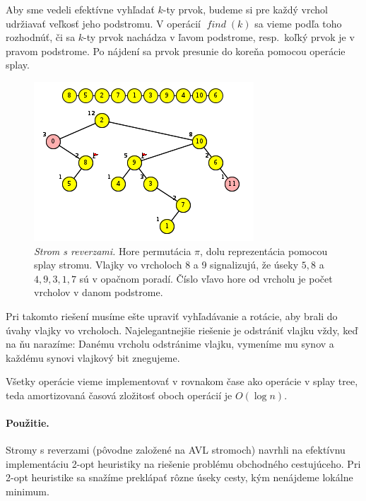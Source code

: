 Aby sme vedeli efektívne vyhľadať $k$-ty prvok, budeme si pre každý vrchol udržiavať veľkosť jeho
podstromu. V operácií $\mathop{\mathit{find}}(k)$ sa vieme podľa toho rozhodnúť, či sa $k$-ty prvok nachádza v ľavom podstrome,
resp.~koľký prvok je v pravom podstrome. Po nájdení sa prvok presunie do koreňa pomocou operácie splay.

\begin{figure}
\includegraphics[width=\columnwidth]{obrazky/reversal.png}
\caption{\emph{Strom s reverzami.} Hore permutácia $\pi$, dolu reprezentácia pomocou splay stromu.
Vlajky vo vrcholoch 8 a 9 signalizujú, že úseky $5,8$ a $4,9,3,1,7$ sú v opačnom poradí. Číslo vľavo
hore od vrcholu je počet vrcholov v danom podstrome.}
\label{img:rev1}
\end{figure}

Pri takomto riešení musíme ešte upraviť vyhľadávanie a rotácie, aby brali do úvahy vlajky vo vrcholoch.
Najelegantnejšie riešenie je odstrániť vlajku vždy, keď na ňu narazíme:
Danému vrcholu odstránime vlajku, vymeníme mu synov a každému synovi vlajkový bit znegujeme.

Všetky operácie vieme implementovať v rovnakom čase ako operácie v splay tree, teda amortizovaná 
časová zložitosť oboch operácií je $O(\log n)$.

\paragraph{Použitie.}
Stromy s reverzami (pôvodne založené na AVL stromoch) navrhli \citet{chrobak}
na efektívnu implementáciu 2-opt heuristiky na riešenie problému obchodného cestujúceho.
Pri 2-opt heuristike sa snažíme preklápať rôzne úseky cesty, kým nenájdeme lokálne minimum.

